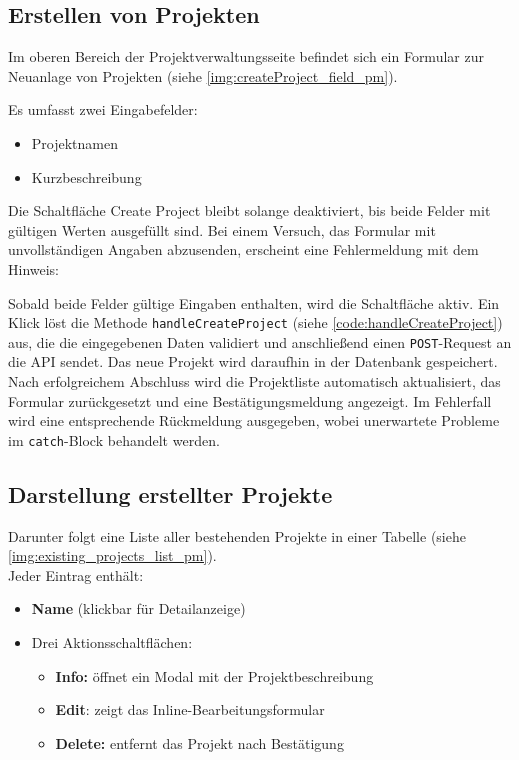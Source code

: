 \subsection*{Erstellen von Projekten}
Im oberen Bereich der Projektverwaltungsseite befindet sich ein Formular zur Neuanlage von Projekten (siehe \autoref{img:createProject_field_pm}).

Es umfasst zwei Eingabefelder: 
\begin{itemize}
    \item Projektnamen
    \item Kurzbeschreibung
  \end{itemize}

\newpage
{}

Die Schaltfläche \glqq Create Project\grqq{} bleibt solange deaktiviert, bis beide Felder mit gültigen Werten ausgefüllt sind. Bei einem Versuch, das Formular mit unvollständigen Angaben abzusenden, erscheint eine Fehlermeldung mit dem Hinweis:


Sobald beide Felder gültige Eingaben enthalten, wird die Schaltfläche aktiv. Ein Klick löst die Methode \texttt{handleCreateProject} (siehe \autoref{code:handleCreateProject}) aus, die die eingegebenen Daten validiert und anschließend einen \texttt{POST}-Request an die API sendet. Das neue Projekt wird daraufhin in der Datenbank gespeichert. Nach erfolgreichem Abschluss wird die Projektliste automatisch aktualisiert, das Formular zurückgesetzt und eine Bestätigungsmeldung angezeigt. Im Fehlerfall wird eine entsprechende Rückmeldung ausgegeben, wobei unerwartete Probleme im \texttt{catch}-Block behandelt werden.



\subsection*{Darstellung erstellter Projekte}
Darunter folgt eine Liste aller bestehenden Projekte in einer Tabelle (siehe \autoref{img:existing_projects_list_pm}). \\
Jeder Eintrag enthält:
\begin{itemize}
  \item \textbf{Name} (klickbar für Detailanzeige)
  \item Drei Aktionsschaltflächen:
    \begin{itemize}
      \item \textbf{Info:} öffnet ein Modal mit der Projektbeschreibung
      \item \textbf{Edit}: zeigt das Inline-Bearbeitungsformular
      \item \textbf{Delete:} entfernt das Projekt nach Bestätigung
    \end{itemize}
\end{itemize}

